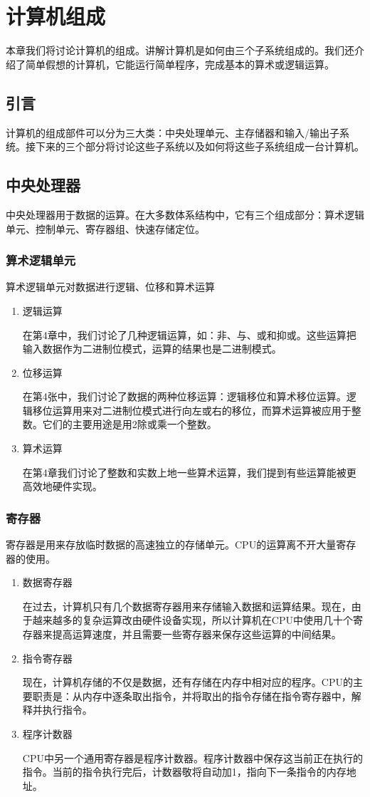 \chapter{计算机组成}
本章我们将讨论计算机的组成。讲解计算机是如何由三个子系统组成的。我们还介绍了简单假想的计算机，它能运行简单程序，完成基本的算术或逻辑运算。

\section{引言}
计算机的组成部件可以分为三大类：中央处理单元、主存储器和输入/输出子系统。接下来的三个部分将讨论这些子系统以及如何将这些子系统组成一台计算机。
\section{中央处理器}
中央处理器用于数据的运算。在大多数体系结构中，它有三个组成部分：算术逻辑单元、控制单元、寄存器组、快速存储定位。
\subsection{算术逻辑单元}
算术逻辑单元对数据进行逻辑、位移和算术运算
\begin{enumerate}
	\item 逻辑运算

	在第4章中，我们讨论了几种逻辑运算，如：非、与、或和抑或。这些运算把输入数据作为二进制位模式，运算的结果也是二进制模式。
	\item 位移运算

	在第4张中，我们讨论了数据的两种位移运算：逻辑移位和算术移位运算。逻辑移位运算用来对二进制位模式进行向左或右的移位，而算术运算被应用于整数。它们的主要用途是用2除或乘一个整数。
	\item 算术运算

	在第4章我们讨论了整数和实数上地一些算术运算，我们提到有些运算能被更高效地硬件实现。
\end{enumerate}
\subsection{寄存器}
寄存器是用来存放临时数据的高速独立的存储单元。CPU的运算离不开大量寄存器的使用。
\begin{enumerate}
	\item 数据寄存器

	在过去，计算机只有几个数据寄存器用来存储输入数据和运算结果。现在，由于越来越多的复杂运算改由硬件设备实现，所以计算机在CPU中使用几十个寄存器来提高运算速度，并且需要一些寄存器来保存这些运算的中间结果。
	\item 指令寄存器 

	现在，计算机存储的不仅是数据，还有存储在内存中相对应的程序。CPU的主要职责是：从内存中逐条取出指令，并将取出的指令存储在指令寄存器中，解释并执行指令。

	\item 程序计数器

	CPU中另一个通用寄存器是程序计数器。程序计数器中保存这当前正在执行的指令。当前的指令执行完后，计数器敬将自动加1，指向下一条指令的内存地址。
\end{enumerate}
